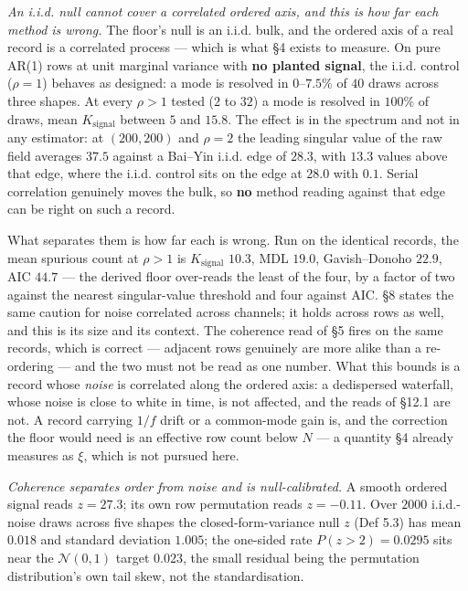 \documentclass[10pt,letterpaper,twocolumn]{article}
\begin{document}
\emph{An i.i.d. null cannot cover a correlated ordered axis, and this is how far each method is wrong.} The floor's null is an i.i.d. bulk, and the ordered axis of a real record is a correlated process --- which is what §4 exists to measure. On pure AR(1) rows at unit marginal variance with \textbf{no planted signal}, the i.i.d. control (\(\rho=1\)) behaves as designed: a mode is resolved in \(0\)--\(7.5\%\) of \(40\) draws across three shapes. At every \(\rho>1\) tested (\(2\) to \(32\)) a mode is resolved in \textbf{\(100\%\)} of draws, mean \(K_{\mathrm{signal}}\) between \(5\) and \(15.8\). The effect is in the spectrum and not in any estimator: at \((200,200)\) and \(\rho=2\) the leading singular value of the raw field averages \(37.5\) against a Bai--Yin i.i.d. edge of \(28.3\), with \(13.3\) values above that edge, where the i.i.d. control sits on the edge at \(28.0\) with \(0.1\). Serial correlation genuinely moves the bulk, so \textbf{no} method reading against that edge can be right on such a record.

What separates them is how far each is wrong. Run on the identical records, the mean spurious count at \(\rho>1\) is \(K_{\mathrm{signal}}\) \(10.3\), MDL \(19.0\), Gavish--Donoho \(22.9\), AIC \(44.7\) --- the derived floor over-reads the least of the four, by a factor of two against the nearest singular-value threshold and four against AIC. §8 states the same caution for noise correlated across channels; it holds across rows as well, and this is its size and its context. The coherence read of §5 fires on the same records, which is correct --- adjacent rows genuinely are more alike than a re-ordering --- and the two must not be read as one number. What this bounds is a record whose \emph{noise} is correlated along the ordered axis: a dedispersed waterfall, whose noise is close to white in time, is not affected, and the reads of §12.1 are not. A record carrying \(1/f\) drift or a common-mode gain is, and the correction the floor would need is an effective row count below \(N\) --- a quantity §4 already measures as \(\xi\), which is not pursued here.

\emph{Coherence separates order from noise and is null-calibrated.} A smooth ordered signal reads \(z=27.3\); its own row permutation reads \(z=-0.11\). Over \(2000\) i.i.d.-noise draws across five shapes the closed-form-variance null \(z\) (Def 5.3) has mean \(0.018\) and standard deviation \(1.005\); the one-sided rate \(P(z>2)=0.0295\) sits near the \(\mathcal N(0,1)\) target \(0.023\), the small residual being the permutation distribution's own tail skew, not the standardisation.
\end{document}
